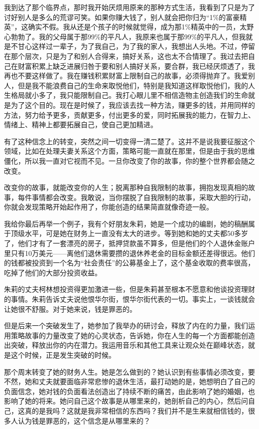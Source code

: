我到达了那个临界点，那时我开始厌烦用原来的那种方式生活，我看到了只是为了讨好别人是多么的荒谬可笑。如果你赚大钱了，别人就会把你归为“1\%的富豪精英”，这确实不假。我从还是个孩子的时候就觉得，成为那1\%精英中的一员，太野心勃勃了。我的父母属于那99\%的平凡人，我原来也属于那99\%的平凡人，但我就是不甘心这样过一辈子，为了我自己，为了我的家人，我想出人头地。不过，停留在那个层次，只是为了和别人合得来，搞好关系，这也太不合情理了。我过去把自己在财富积累上缺乏进展归咎于要和别人搞好关系，要合群，我已经厌烦透了，我再也不要这样做了。我在赚钱积累财富上限制自己的故事，必须得抛弃了。我爱别人，但是我不能浪费自己的生命来取悦他们，特别是我知道这样取悦他们，我的人生格局就小多了，我只能限制自己。我打心眼儿里不相信造物主创造我们的生命就是为了这个目的。现在是时候了，我应该去找一种方法，赚更多的钱，并用同样的方法，努力给予更多，贡献更多，付出更多的爱，同时拓展我的能力，在智力上、情绪上、精神上都要拓展自己，使自己更加精进。

有了这种信念上的转变，突然之间一切变得一清二楚了。这并不是说我要征服这个领域，比如在处理夫妻关系这个方面，策略可能一直就在那里，但是由于我的思维僵化，所以我一直对它视而不见。一旦你改变了你的故事，你的整个世界都会随之改变。

改变你的故事，就能改变你的人生；脱离那种自我限制的故事，拥抱发现真相的故事，每件事情都会改变。我敢说，当你摆脱了自我限制的故事，采取大胆的行动，你就会发现策略开始起作用了，你能创造的结果简直就像奇迹一般。

我给你最后再举一个例子，我有个好朋友朱莉，她是一个成功的编剧，她的稿酬属于顶级水平，可是她在财务上一直没有太大的进步。等到她和她的丈夫都50多岁了，他们才有了一套漂亮的房子，抵押贷款虽不算多，但是他们的个人退休金账户里只有10万美元——离他们退休需要攒的退休养老金的目标金额还差得很远。他们的钱都被投资到一个名为“社会责任”的公募基金上了，这个基金收取的费率很高，吃掉了他们的大部分投资收益。

朱莉的丈夫柯林想投资得更加激进一些，但是朱莉甚至根本不愿意和他谈投资理财的事情。朱莉告诉丈夫说他恨华尔街，恨华尔街代表的一切。事实上，一谈钱就会让她很不舒服。对于她来说，钱是罪恶的。

但是后来一个突破发生了，她参加了我举办的研讨会，释放了内在的力量，我们运用策略故事的力量改变了她的心灵状态，告诉她，你在人生的每一个方面都能创造出突破，释放出你的内在潜力。我运用音乐和其他工具来让观众处在巅峰状态，就是这个时候，正是发生突破的时候。

那个周末转变了她的财务人生。她是怎么做到的？她认识到有些事情必须改变，要不然，她和丈夫就要面临非常悲惨的退休生活，最打动她的是，她想明白了自己的负面信念，她对钱的负面看法创造出了持续不断的痛苦，由此影响了她的婚姻，也影响了她的将来。她问自己这个故事是从哪里来的，她剖析自己的内心，然后问自己，这真的是我吗？这就是我非常相信的东西吗？我们并不是生来就相信钱的，很多人认为钱是罪恶的，这个信念是从哪里来的？

